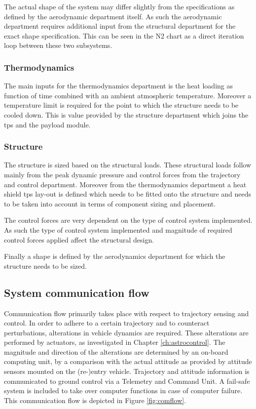 The actual shape of the system may differ slightly from the specifications as defined by the aerodynamic department itself. As such the aerodynamic department requires additional input from the structural department for the exact shape specification. This can be seen in the N2 chart as a direct iteration loop between these two subsystems.

\subsubsection{Thermodynamics}
The main inputs for the thermodynamics department is the heat loading as function of time combined with an ambient atmospheric temperature. Moreover a temperature limit is required for the point to which the structure needs to be cooled down. This is value provided by the structure department which joins the \gls{tps} and the payload module.

\subsubsection{Structure}

The structure is sized based on the structural loads. These structural loads follow mainly from the peak dynamic pressure and control forces from the trajectory and control department. Moreover from the thermodynamics department a heat shield \gls{tps} lay-out is defined which needs to be fitted onto the structure and needs to be taken into account in terms of component sizing and placement.

The control forces are very dependent on the type of control system implemented. As such the type of control system implemented and magnitude of required control forces applied affect the structural design.

Finally a shape is defined by the aerodynamics department for which the structure needs to be sized. 

\subsection{System communication flow} \label{sec:comflow}
Communication flow primarily takes place with respect to trajectory sensing and control. In order to adhere to a certain trajectory and to counteract perturbations, alterations in vehicle dynamics are required. These alterations are performed by actuators, as investigated in Chapter \ref{ch:astrocontrol}. The magnitude and direction of the alterations are determined by an on-board computing unit, by a comparison with the actual attitude as provided by attitude sensors mounted on the (re-)entry vehicle. Trajectory and attitude information is communicated to ground control via a Telemetry and Command Unit. A fail-safe system is included to take over computer functions in case of computer failure. This communication flow is depicted in Figure  \ref{fig:comflow}.

